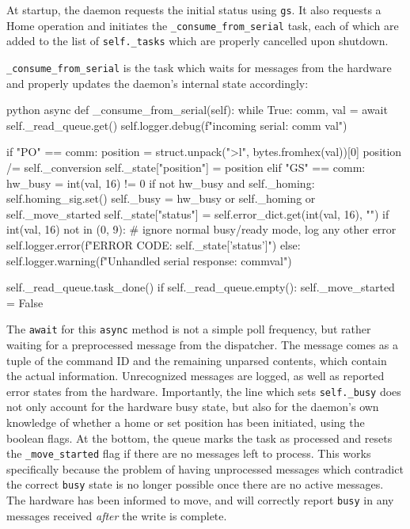 At startup, the daemon requests the initial status using \texttt{gs}.
It also requests a Home operation and initiates the \texttt{\_consume\_from\_serial} task, each of which are added to the list of \texttt{self.\_tasks} which are properly cancelled upon shutdown.

\texttt{\_consume\_from\_serial} is the task which waits for messages from the hardware and properly updates the daemon's internal state accordingly:

\begin{codefragment}{python}
async def _consume_from_serial(self):
    while True:
        comm, val = await self._read_queue.get()
        self.logger.debug(f"incoming serial: {comm} {val}")

        if "PO" == comm:
            position = struct.unpack(">l", bytes.fromhex(val))[0]
            position /= self._conversion
            self._state["position"] = position
        elif "GS" == comm:
            hw_busy = int(val, 16) != 0
            if not hw_busy and self._homing:
                self.homing_sig.set()
            self._busy = hw_busy or self._homing or self._move_started
            self._state["status"] = self.error_dict.get(int(val, 16), "")
            if int(val, 16) not in (0, 9):
                # ignore normal busy/ready mode, log any other error
                self.logger.error(f"ERROR CODE: {self._state['status']}")
        else:
            self.logger.warning(f"Unhandled serial response: {comm}{val}")

        self._read_queue.task_done()
        if self._read_queue.empty():
            self._move_started = False
\end{codefragment}

The \texttt{await} for this \texttt{async} method is not a simple poll frequency, but rather waiting for a preprocessed message from the dispatcher.
The message comes as a tuple of the command ID and the remaining unparsed contents, which contain the actual information.
Unrecognized messages are logged, as well as reported error states from the hardware.
Importantly, the line which sets \texttt{self.\_busy} does not only account for the hardware busy state, but also for the daemon's own knowledge of whether a home or set position has been initiated, using the boolean flags.
At the bottom, the queue marks the task as processed and resets the \texttt{\_move\_started} flag if there are no messages left to process.
This works specifically because the problem of having unprocessed messages which contradict the correct \texttt{busy} state is no longer possible once there are no active messages.
The hardware has been informed to move, and will correctly report \texttt{busy} in any messages received \textit{after} the write is complete.

